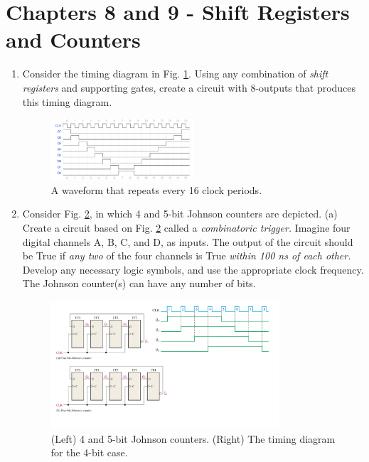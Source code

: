 \documentclass[10pt]{article}
\begin{document}
\clearpage

\section{Chapters 8 and 9 - Shift Registers and Counters}

\begin{enumerate}
\item Consider the timing diagram in Fig. \ref{fig:sr1}.  Using any combination of \textit{shift registers} and supporting gates, create a circuit with 8-outputs that produces this timing diagram.
\begin{figure}[ht]
\centering
\includegraphics[width=0.5\textwidth]{figures/timingExample15.pdf}
\caption{\label{fig:sr1} A waveform that repeats every 16 clock periods.}
\end{figure} \vspace{4cm}
\item Consider Fig. \ref{fig:SRG8}, in which 4 and 5-bit Johnson counters are depicted.  (a) Create a circuit based on Fig. \ref{fig:SRG8} called a \textit{combinatoric trigger.}  Imagine four digital channels A, B, C, and D, as inputs.  The output of the circuit should be True if \textit{any two} of the four channels is True \textit{within 100 ns of each other.}  Develop any necessary logic symbols, and use the appropriate clock frequency.  The Johnson counter(s) can have any number of bits.
\begin{figure}[hb]
\centering
\includegraphics[width=0.8\textwidth]{figures/SRG8.pdf}
\caption{\label{fig:SRG8} (Left) 4 and 5-bit Johnson counters. (Right) The timing diagram for the 4-bit case.}
\end{figure}
\end{enumerate}
\end{document}
